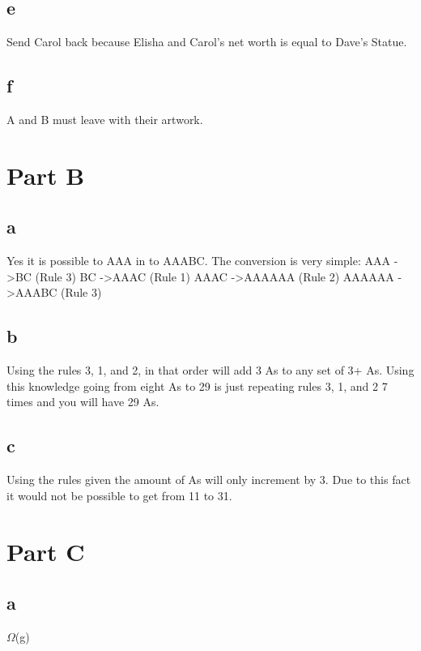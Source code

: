 \documentclass[12pt]{amsart}
\begin{document}
\subsection*{e}
Send Carol back because Elisha and Carol's net worth is equal to Dave's Statue. 

\subsection*{f}
A and B must leave with their artwork.

\newpage

\section*{Part B}
\subsection*{a}
Yes it is possible to AAA in to AAABC. The conversion is very simple:
\newline
AAA \quad -\textgreater \quad BC (Rule 3) %
\newline
BC \quad -\textgreater \quad AAAC (Rule 1) %
\newline
AAAC \quad -\textgreater \quad AAAAAA (Rule 2) %
\newline
AAAAAA \quad -\textgreater \quad AAABC (Rule 3) %


\subsection*{b}
Using the rules 3, 1, and 2, in that order will add 3 As to any set of 3+ As. Using this knowledge going from eight As to 29 is just repeating rules 3, 1, and 2 7 times and you will have 29 As.

\subsection*{c}
Using the rules given the amount of As will only increment by 3. Due to this fact it would not be possible to get from 11 to 31.

\newpage

\section*{Part C}
\subsection*{a}
$\Omega$(g)
\end{document}

